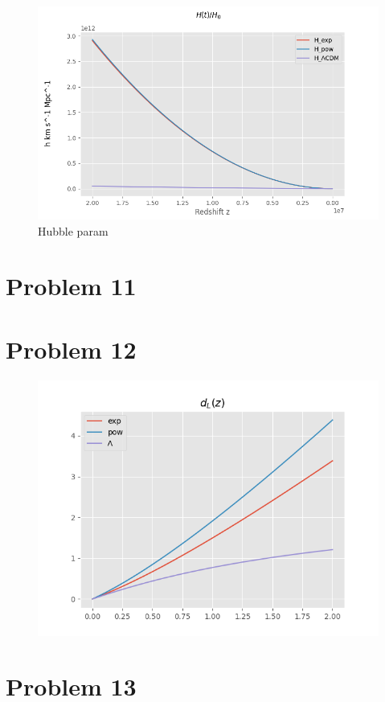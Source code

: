 \documentclass[reprint,english,notitlepage]{revtex4-1}  %
\begin{document}
\begin{figure}[h!]
	\includegraphics[scale=0.4]{Hubble.png}
	\caption{Hubble param}
	\label{}
\end{figure}

\section{Problem 11}

\section{Problem 12}
\begin{figure}[h!]
	\includegraphics[scale=0.4]{lum_distance.png}
	\caption{}
	\label{}
\end{figure}


\section{Problem 13}
\end{document}
